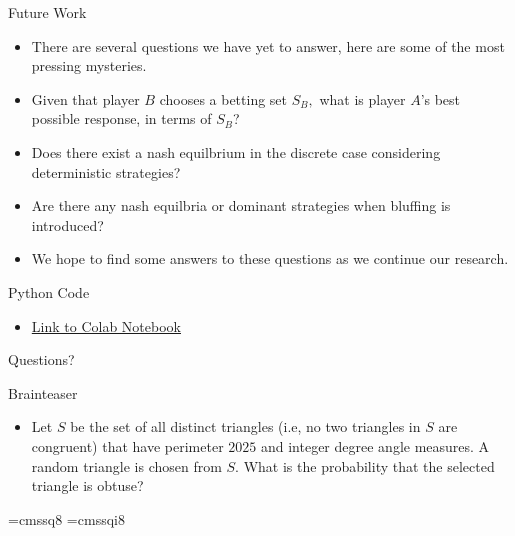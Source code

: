 \documentclass[aspectratio=169]{beamer}
\begin{document}
\begin{frame}{Future Work}
\begin{itemize}
\item There are several questions we have yet to answer, here are some of the most pressing mysteries. \pause
\item Given that player $B$ chooses a betting set $S_B,$ what is player $A$'s best possible response, in terms of $S_B$? \pause
\item Does there exist a nash equilbrium in the discrete case considering deterministic strategies? \pause
\item Are there any nash equilbria or dominant strategies when bluffing is introduced? \pause
\item We hope to find some answers to these questions as we continue our research.
\end{itemize}
\end{frame}
    \begin{frame}{Python Code}
    \begin{itemize}
        \item \href{https://colab.research.google.com/github/aryan-cs/poker-like-games/blob/discrete-poker/discrete_poker_games.ipynb\#scrollTo=rYfmVTdfblIf}{Link to Colab Notebook}
    \end{itemize}
\end{frame}
\begin{frame}{}
      \begin{center}
    {\color{sigma@mainblue} \LARGE Questions?}
  \end{center}
\end{frame}

\begin{frame}{Brainteaser}
\begin{itemize}
    \item Let $S$ be the set of all distinct triangles (i.e, no two triangles in $S$ are congruent) that have perimeter $2025$ and integer degree angle measures. A random triangle is chosen from $S$. What is the probability that the selected triangle is obtuse? 
    \end{itemize}
\end{frame}

\font\eightss=cmssq8
\font\eightssi=cmssqi8
\newcommand\quoteAuthorDate[3]{\begingroup
  \baselineskip 10pt
  \parfillskip 0pt
  \interlinepenalty 10000 %
  \leftskip 0pt plus 40pc minus \parindent
  \let\rm=\eightss
  \let\sl=\eightssi
  \everypar{\sl}#1\par
  \nobreak\smallskip
  \noindent\rm--- #2\unskip\enspace(#3)\par
  \endgroup}
\end{document}
